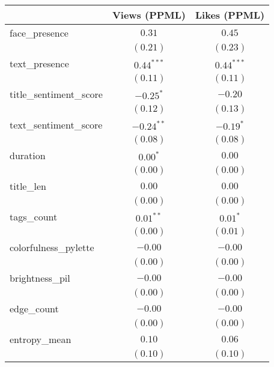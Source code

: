 
\begin{table}
\begin{center}
\begin{tabular}{l c c}
\hline
 & Views (PPML) & Likes (PPML) \\
\hline
face\_presence                & $0.31$          & $0.45$         \\
                              & $(0.21)$        & $(0.23)$       \\
text\_presence                & $0.44^{***}$    & $0.44^{***}$   \\
                              & $(0.11)$        & $(0.11)$       \\
title\_sentiment\_score       & $-0.25^{*}$     & $-0.20$        \\
                              & $(0.12)$        & $(0.13)$       \\
text\_sentiment\_score        & $-0.24^{**}$    & $-0.19^{*}$    \\
                              & $(0.08)$        & $(0.08)$       \\
duration                      & $0.00^{*}$      & $0.00$         \\
                              & $(0.00)$        & $(0.00)$       \\
title\_len                    & $0.00$          & $0.00$         \\
                              & $(0.00)$        & $(0.00)$       \\
tags\_count                   & $0.01^{**}$     & $0.01^{*}$     \\
                              & $(0.00)$        & $(0.01)$       \\
colorfulness\_pylette         & $-0.00$         & $-0.00$        \\
                              & $(0.00)$        & $(0.00)$       \\
brightness\_pil               & $-0.00$         & $-0.00$        \\
                              & $(0.00)$        & $(0.00)$       \\
edge\_count                   & $-0.00$         & $-0.00$        \\
                              & $(0.00)$        & $(0.00)$       \\
entropy\_mean                 & $0.10$          & $0.06$         \\
                              & $(0.10)$        & $(0.10)$       \\

\end{tabular}
\end{center}
\end{table}
